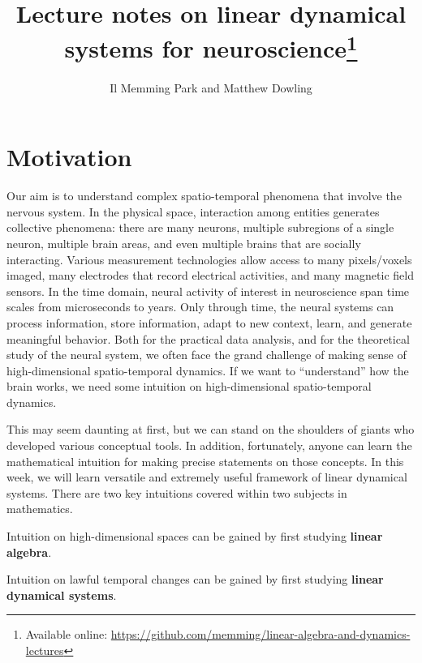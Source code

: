 \documentclass[a4paper,11pt]{exam}
\title{Lecture notes on linear dynamical systems for neuroscience\footnote{Available online: \url{https://github.com/memming/linear-algebra-and-dynamics-lectures}}}
\author{Il Memming Park and Matthew Dowling} %
\newcounter{ct}
\begin{document}
\maketitle
\section{Motivation}
Our aim is to understand complex spatio-temporal phenomena that involve the nervous system.
In the physical space, interaction among entities generates collective phenomena: there are many neurons, multiple subregions of a single neuron, multiple brain areas, and even multiple brains that are socially interacting.
Various measurement technologies allow access to many pixels/voxels imaged, many electrodes that record electrical activities, and many magnetic field sensors.
In the time domain, neural activity of interest in neuroscience span time scales from microseconds to years.
Only through time, the neural systems can process information, store information, adapt to new context, learn, and generate meaningful behavior.
Both for the practical data analysis, and for the theoretical study of the neural system, we often face the grand challenge of making sense of high-dimensional spatio-temporal dynamics.
If we want to ``understand'' how the brain works, we need some intuition on high-dimensional spatio-temporal dynamics.

This may seem daunting at first, but we can stand on the shoulders of giants who developed various conceptual tools.
In addition, fortunately, anyone can learn the mathematical intuition for making precise statements on those concepts.
In this week, we will learn versatile and extremely useful framework of linear dynamical systems.
There are two key intuitions covered within two subjects in mathematics.
\begin{tcolorbox}[colback=black!1!,title=Learning Objective 1]
    Intuition on high-dimensional spaces can be gained by first studying \textbf{linear algebra}.
\end{tcolorbox}
\begin{tcolorbox}[colback=black!1!,title=Learning Objective 2]
    Intuition on lawful temporal changes can be gained by first studying \textbf{linear dynamical systems}.
\end{tcolorbox}
\end{document}
